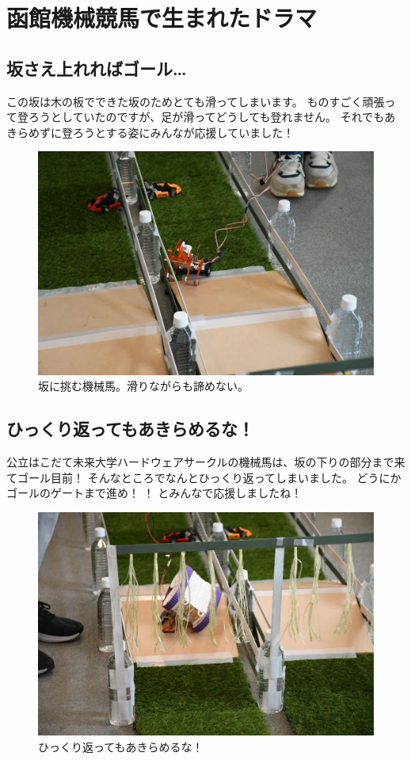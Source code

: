 \section{函館機械競馬で生まれたドラマ}
\subsection{坂さえ上れればゴール…}
この坂は木の板でできた坂のためとても滑ってしまいます。  
ものすごく頑張って登ろうとしていたのですが、足が滑ってどうしても登れません。  
それでもあきらめずに登ろうとする姿にみんなが応援していました！

\begin{figure}[h]
\centering
\includegraphics[width=0.7\linewidth]{pages/images/slope.png}
\caption{坂に挑む機械馬。滑りながらも諦めない。}
\end{figure}

\clearpage

\subsection{ひっくり返ってもあきらめるな！}
公立はこだて未来大学ハードウェアサークルの機械馬は、坂の下りの部分まで来てゴール目前！  
そんなところでなんとひっくり返ってしまいました。  
どうにかゴールのゲートまで進め！ ！ とみんなで応援しましたね！

\begin{figure}[h]
\centering
\includegraphics[width=0.7\linewidth]{pages/images/reverse.png}
\caption{ひっくり返ってもあきらめるな！}
\end{figure}

